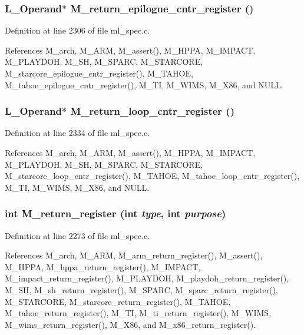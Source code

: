 \subsubsection{\setlength{\rightskip}{0pt plus 5cm}L\_\-Operand$\ast$ M\_\-return\_\-epilogue\_\-cntr\_\-register ()}\label{m__spec_8h_462adaf13d377690c81f298e03f04687}




Definition at line 2306 of file ml\_\-spec.c.

References M\_\-arch, M\_\-ARM, M\_\-assert(), M\_\-HPPA, M\_\-IMPACT, M\_\-PLAYDOH, M\_\-SH, M\_\-SPARC, M\_\-STARCORE, M\_\-starcore\_\-epilogue\_\-cntr\_\-register(), M\_\-TAHOE, M\_\-tahoe\_\-epilogue\_\-cntr\_\-register(), M\_\-TI, M\_\-WIMS, M\_\-X86, and NULL.
\subsubsection{\setlength{\rightskip}{0pt plus 5cm}L\_\-Operand$\ast$ M\_\-return\_\-loop\_\-cntr\_\-register ()}\label{m__spec_8h_e9934903eaae9f233a82711bb4b7f2b7}




Definition at line 2334 of file ml\_\-spec.c.

References M\_\-arch, M\_\-ARM, M\_\-assert(), M\_\-HPPA, M\_\-IMPACT, M\_\-PLAYDOH, M\_\-SH, M\_\-SPARC, M\_\-STARCORE, M\_\-starcore\_\-loop\_\-cntr\_\-register(), M\_\-TAHOE, M\_\-tahoe\_\-loop\_\-cntr\_\-register(), M\_\-TI, M\_\-WIMS, M\_\-X86, and NULL.
\subsubsection{\setlength{\rightskip}{0pt plus 5cm}int M\_\-return\_\-register (int {\em type}, int {\em purpose})}\label{m__spec_8h_d7b1408fda044249300339cbb6bb5b99}




Definition at line 2273 of file ml\_\-spec.c.

References M\_\-arch, M\_\-ARM, M\_\-arm\_\-return\_\-register(), M\_\-assert(), M\_\-HPPA, M\_\-hppa\_\-return\_\-register(), M\_\-IMPACT, M\_\-impact\_\-return\_\-register(), M\_\-PLAYDOH, M\_\-playdoh\_\-return\_\-register(), M\_\-SH, M\_\-sh\_\-return\_\-register(), M\_\-SPARC, M\_\-sparc\_\-return\_\-register(), M\_\-STARCORE, M\_\-starcore\_\-return\_\-register(), M\_\-TAHOE, M\_\-tahoe\_\-return\_\-register(), M\_\-TI, M\_\-ti\_\-return\_\-register(), M\_\-WIMS, M\_\-wims\_\-return\_\-register(), M\_\-X86, and M\_\-x86\_\-return\_\-register().
